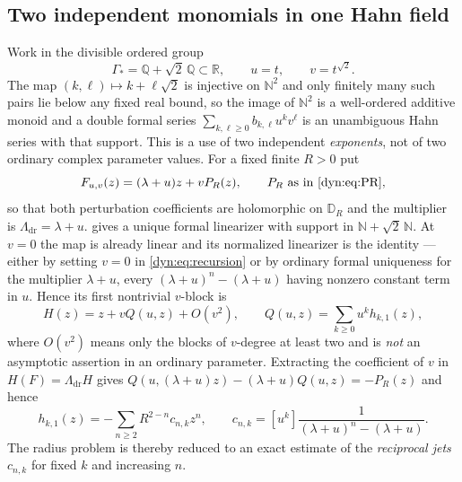 \documentclass[11pt,letterpaper]{article}
\theoremstyle{definition}
\theoremstyle{remark}
\newcommand{\R}{\mathbb R}
\newcommand{\Q}{\mathbb Q}
\newcommand{\N}{\mathbb N}
\numberwithin{equation}{section}
\begin{document}
\subsection{Two independent monomials in one Hahn field}
Work in the divisible ordered group
\[
 \Gamma_{*}=\Q+\sqrt2\,\Q\subset\R,\qquad u=t,\qquad v=t^{\sqrt2}.
\]
The map $(k,\ell)\mapsto k+\ell\sqrt2$ is injective on $\N^{2}$ and only
finitely many such pairs lie below any fixed real bound, so the image of
$\N^{2}$ is a well-ordered additive monoid and a double formal series
$\sum_{k,\ell\ge0}b_{k,\ell}u^{k}v^{\ell}$ is an unambiguous Hahn series
with that support. This is a use of two independent \emph{exponents}, not
of two ordinary complex parameter values. For a fixed finite $R>0$ put
\begin{equation}\label{dyn:eq:familyintro}
 F_{u,v}(z)=(\lambda+u)z+vP_R(z),\qquad P_R \text{ as in }\eqref{dyn:eq:PR},
\end{equation}
so that both perturbation coefficients are holomorphic on $\mathbb D_R$ and
the multiplier is $\Lambda_{\mathrm{dr}}=\lambda+u$.
 gives a unique formal linearizer with support in
$\N+\sqrt2\,\N$. At $v=0$ the map is already linear and its normalized
linearizer is the identity --- either by setting $v=0$ in
\eqref{dyn:eq:recursion} or by ordinary formal uniqueness for the
multiplier $\lambda+u$, every $(\lambda+u)^{n}-(\lambda+u)$ having nonzero
constant term in $u$. Hence its first nontrivial $v$-block is
\begin{equation}\label{dyn:eq:Qblock}
 H(z)=z+vQ(u,z)+O(v^{2}),\qquad Q(u,z)=\sum_{k\ge0}u^{k}h_{k,1}(z),
\end{equation}
where $O(v^{2})$ means only the blocks of $v$-degree at least two and is
\emph{not} an asymptotic assertion in an ordinary parameter. Extracting the
coefficient of $v$ in $H(F)=\Lambda_{\mathrm{dr}}H$ gives
$Q(u,(\lambda+u)z)-(\lambda+u)Q(u,z)=-P_R(z)$ and hence
\begin{equation}\label{dyn:eq:blockformula}
 h_{k,1}(z)=-\sum_{n\ge2}R^{2-n}c_{n,k}z^{n},\qquad
 c_{n,k}=[u^{k}]\frac1{(\lambda+u)^{n}-(\lambda+u)} .
\end{equation}
The radius problem is thereby reduced to an exact estimate of the
\emph{reciprocal jets} $c_{n,k}$ for fixed $k$ and increasing $n$.
\end{document}
